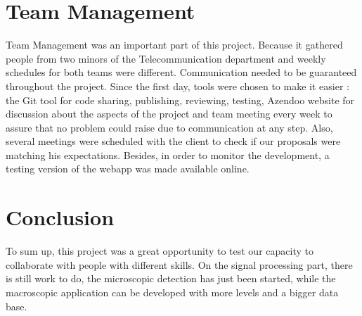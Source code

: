 %
%
\section{Team Management}

Team Management was an important part of this project. Because it gathered people from two minors of the Telecommunication department and weekly schedules for both teams were different. Communication needed to be guaranteed throughout the project. Since the first day, tools were chosen to make it easier : the Git tool for code sharing, publishing, reviewing, testing, Azendoo website for discussion about the aspects of the project and team meeting every week to assure that no problem could raise due to communication at any step. Also, several meetings were scheduled with the client to check if our proposals were matching his expectations. Besides, in order to monitor the development, a testing version of the webapp was made available online.\\

\section{Conclusion}

To sum up, this project was a great opportunity to test our capacity to collaborate with people with different skills. On the signal processing part, there is still work to do, the microscopic detection has just been started, while the macroscopic application can be developed with more levels and a bigger data base.

%
%
%

